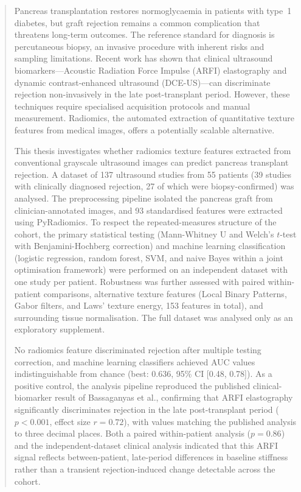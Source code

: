 
\begin{abstract}

Pancreas transplantation restores normoglycaemia in patients with type~1 diabetes, but graft rejection remains a common complication that threatens long-term outcomes. The reference standard for diagnosis is percutaneous biopsy, an invasive procedure with inherent risks and sampling limitations. Recent work has shown that clinical ultrasound biomarkers---Acoustic Radiation Force Impulse (ARFI) elastography and dynamic contrast-enhanced ultrasound (DCE-US)---can discriminate rejection non-invasively in the late post-transplant period. However, these techniques require specialised acquisition protocols and manual measurement. Radiomics, the automated extraction of quantitative texture features from medical images, offers a potentially scalable alternative.

This thesis investigates whether radiomics texture features extracted from conventional grayscale ultrasound images can predict pancreas transplant rejection. A dataset of 137 ultrasound studies from 55 patients (39 studies with clinically diagnosed rejection, 27 of which were biopsy-confirmed) was analysed. The preprocessing pipeline isolated the pancreas graft from clinician-annotated images, and 93 standardised features were extracted using PyRadiomics. To respect the repeated-measures structure of the cohort, the primary statistical testing (Mann-Whitney U and Welch's $t$-test with Benjamini-Hochberg correction) and machine learning classification (logistic regression, random forest, SVM, and naive Bayes within a joint optimisation framework) were performed on an independent dataset with one study per patient. Robustness was further assessed with paired within-patient comparisons, alternative texture features (Local Binary Patterns, Gabor filters, and Laws' texture energy, 153 features in total), and surrounding tissue normalisation. The full dataset was analysed only as an exploratory supplement.

No radiomics feature discriminated rejection after multiple testing correction, and machine learning classifiers achieved AUC values indistinguishable from chance (best: 0.636, 95\% CI [0.48, 0.78]). As a positive control, the analysis pipeline reproduced the published clinical-biomarker result of Bassaganyas et al., confirming that ARFI elastography significantly discriminates rejection in the late post-transplant period ($p < 0.001$, effect size $r = 0.72$), with values matching the published analysis to three decimal places. Both a paired within-patient analysis ($p = 0.86$) and the independent-dataset clinical analysis indicated that this ARFI signal reflects between-patient, late-period differences in baseline stiffness rather than a transient rejection-induced change detectable across the cohort.


\end{abstract}
